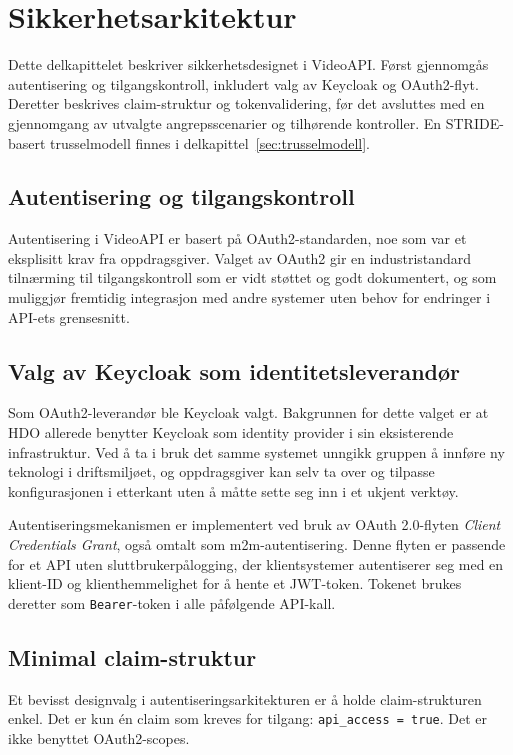 \section{Sikkerhetsarkitektur}
\label{sec:design-sikkerhet}
Dette delkapittelet beskriver sikkerhetsdesignet i VideoAPI. Først gjennomgås autentisering og tilgangskontroll, inkludert valg av Keycloak og OAuth2-flyt. Deretter beskrives claim-struktur og tokenvalidering, før det avsluttes med en gjennomgang av utvalgte angrepsscenarier og tilhørende kontroller. En STRIDE-basert trusselmodell finnes i delkapittel~\ref{sec:trusselmodell}.

\subsection{Autentisering og tilgangskontroll}

Autentisering i VideoAPI er basert på OAuth2-standarden, noe som var et eksplisitt krav fra oppdragsgiver. Valget av OAuth2 gir en industristandard tilnærming til tilgangskontroll som er vidt støttet og godt dokumentert, og som muliggjør fremtidig integrasjon med andre systemer uten behov for endringer i API-ets grensesnitt.

\subsection{Valg av Keycloak som identitetsleverandør}

Som OAuth2-leverandør ble Keycloak valgt. Bakgrunnen for dette valget er at HDO allerede benytter Keycloak som identity provider i sin eksisterende infrastruktur. Ved å ta i bruk det samme systemet unngikk gruppen å innføre ny teknologi i driftsmiljøet, og oppdragsgiver kan selv ta over og tilpasse konfigurasjonen i etterkant uten å måtte sette seg inn i et ukjent verktøy.

Autentiseringsmekanismen er implementert ved bruk av OAuth 2.0-flyten \textit{Client Credentials Grant}, også omtalt som \gls{m2m}-autentisering. Denne flyten er passende for et API uten sluttbrukerpålogging, der klientsystemer autentiserer seg med en klient-ID og klienthemmelighet for å hente et JWT-token. Tokenet brukes deretter som \texttt{Bearer}-token i alle påfølgende API-kall.

\subsection{Minimal claim-struktur}

Et bevisst designvalg i autentiseringsarkitekturen er å holde claim-strukturen enkel. Det er kun én claim som kreves for tilgang: \texttt{api\_access = true}. Det er ikke benyttet OAuth2-scopes.


